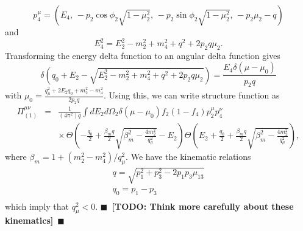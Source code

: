 \documentclass[12pt,letter]{article}
\newcommand{\todo}[1]{{$\blacksquare$~\textbf{\color{blue}[TODO: #1]}}~$\blacksquare$}
\begin{document}
\begin{equation*}
p^\mu_4 = (E_4, \, 
-p_2 \cos \phi_2 \sqrt{1-\mu_2^2}, \,
-p_2 \sin \phi_2 \sqrt{1-\mu_2^2}, \,
-p_2 \mu_2 - q)
\end{equation*}
and 
\begin{equation*}
E_4^2 = E_2^2 - m_2^2 + m_4^2 + q^2 + 2 p_2 q \mu_2.  
\end{equation*}
Transforming the energy delta function to an angular delta function gives 
\begin{equation*}
\delta\left(q_0 + E_2 - \sqrt{E_2^2 - m_2^2 + m_4^2 + q^2 + 2 p_2 q \mu_2} \right) 
= \frac{E_4 \delta(\mu - \mu_0)}{p_2 q} 
\end{equation*} 
with $\mu_0 = \frac{q_\mu^2 + 2 E_2 q_0 + m_2^2 - m_4^2}{2 p_2 q}$.  Using this, we can write structure function as 
\begin{eqnarray*}
\Pi^{\mu \nu}_{(1)} &=& \frac{1}{(4 \pi^2) q} \int dE_2 d\Omega_2 
\delta (\mu - \mu_0) f_2 (1 - f_4) p_2^\mu p_4^\nu 
\\ && \times \, 
\Theta \left(-\frac{q_0}{2} + \frac{\beta_m q}{2} \sqrt{\beta_m^2-\frac{4m_2^2}{q_\mu^2}} - E_2\right)
\Theta \left(E_2 + \frac{q_0}{2} + \frac{\beta_m q}{2} \sqrt{\beta_m^2-\frac{4m_2^2}{q_\mu^2}}\right),
\end{eqnarray*} 
where $\beta_m = 1 + (m_2^2 - m_4^2)/q_\mu^2$.  We have the kinematic relations
\begin{eqnarray*}
q = \sqrt{p_1^2 + p_3^2 - 2 p_1 p_3 \mu_{13}} \\
q_0 = p_1 - p_3 \\ 
\end{eqnarray*}
which imply that $q_\mu^2 < 0$.  \todo{Think more carefully about these kinematics}
 
 
\end{document}
